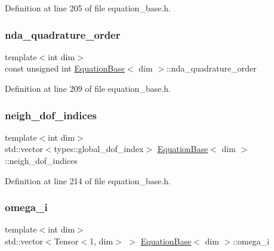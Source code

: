 Definition at line 205 of file equation\+\_\+base.\+h.

\mbox{\label{class_equation_base_aafed438df52a6a2adca972fad322dd7b}} 
\subsubsection{\texorpdfstring{nda\+\_\+quadrature\+\_\+order}{nda\_quadrature\_order}}
{\footnotesize\ttfamily template$<$int dim$>$ \\
const unsigned int \hyperlink{class_equation_base}{Equation\+Base}$<$ dim $>$\+::nda\+\_\+quadrature\+\_\+order\hspace{0.3cm}{\ttfamily [protected]}}



Definition at line 209 of file equation\+\_\+base.\+h.

\mbox{\label{class_equation_base_a94114d6debfbf1955c3c39f5330ac3c2}} 
\subsubsection{\texorpdfstring{neigh\+\_\+dof\+\_\+indices}{neigh\_dof\_indices}}
{\footnotesize\ttfamily template$<$int dim$>$ \\
std\+::vector$<$types\+::global\+\_\+dof\+\_\+index$>$ \hyperlink{class_equation_base}{Equation\+Base}$<$ dim $>$\+::neigh\+\_\+dof\+\_\+indices\hspace{0.3cm}{\ttfamily [protected]}}



Definition at line 214 of file equation\+\_\+base.\+h.

\mbox{\label{class_equation_base_a46320b14358dd65c8450bba919c856d0}} 
\subsubsection{\texorpdfstring{omega\+\_\+i}{omega\_i}}
{\footnotesize\ttfamily template$<$int dim$>$ \\
std\+::vector$<$Tensor$<$1, dim$>$ $>$ \hyperlink{class_equation_base}{Equation\+Base}$<$ dim $>$\+::omega\+\_\+i\hspace{0.3cm}{\ttfamily [protected]}}



